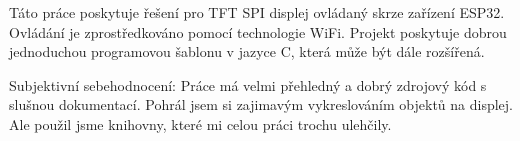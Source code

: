 Táto práce poskytuje řešení pro TFT SPI displej ovládaný skrze zařízení ESP32. Ovládání je zprostředkováno pomocí technologie WiFi. Projekt poskytuje dobrou jednoduchou programovou šablonu v jazyce C, která může být dále rozšířená.

Subjektivní sebehodnocení: Práce má velmi přehledný a dobrý zdrojový kód s slušnou dokumentací. Pohrál jsem si zajimavým vykreslováním objektů na displej. Ale použil jsme knihovny, které mi celou práci trochu ulehčily. 



